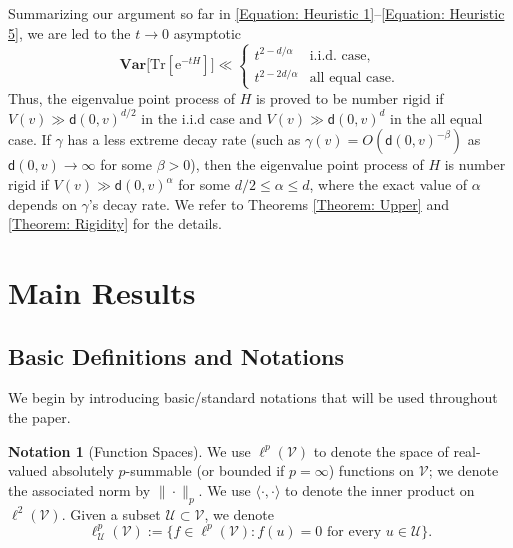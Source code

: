 \documentclass{amsart}
\numberwithin{equation}{section}
\theoremstyle{definition}
\newtheorem{notation}[theorem]{Notation}
\newcommand\al{\alpha}
\newcommand\be{\beta}
\newcommand\ga{\gamma}
\newcommand\mbf{\mathbf}
\newcommand\mr{\mathrm}
\newcommand\ms{\mathscr}
\newcommand\msf{\mathsf}
\begin{document}
%

Summarizing our argument so far in \eqref{Equation: Heuristic 1}--\eqref{Equation: Heuristic 5},
we are led to the $t\to0$ asymptotic
\[\mbf{Var}\big[\mr{Tr}[\mr e^{-t H}]\big]
\ll
\begin{cases}
t^{2-d/\al}&\text{i.i.d. case,}\\
t^{2-2d/\al}&\text{all equal case.}
\end{cases}\]
Thus, the eigenvalue point process of $H$ is proved to be number rigid if $V(v)\gg\msf d(0,v)^{d/2}$ in the i.i.d case
and $V(v)\gg\msf d(0,v)^d$ in the all equal case. If $\ga$ has a less extreme decay rate
(such as $\ga(v)=O(\msf d(0,v)^{-\be})$ as $\msf d(0,v)\to\infty$ for some $\be>0$), then the eigenvalue point process of $H$ is number rigid if $V(v)\gg\msf d(0,v)^\al$ for some $d/2\leq\al\leq d$, where the exact value
of $\al$ depends on $\ga$'s decay rate. We refer to Theorems \ref{Theorem: Upper} and \ref{Theorem: Rigidity}
for the details.

%

\section{Main Results}\label{sec:Main Result}

%

\subsection{Basic Definitions and Notations}

%

We begin by introducing basic/standard notations
that will be used throughout the paper.

%

\begin{notation}[Function Spaces]
We use $\ell^p(\ms V)$ to denote the space of real-valued
absolutely $p$-summable (or bounded if $p=\infty$) functions on $\ms V$; we
denote the associated norm by $\|\cdot\|_{p}$.
We use $\langle\cdot,\cdot\rangle$ to denote the inner
product on $\ell^2(\ms V)$.
Given a subset $\ms U\subset\ms V$, we denote
\[\ell^p_\ms U(\ms V):=\{f\in\ell^p(\ms V):f(u)=0\text{ for every }u\in\ms U\}.\]
\end{notation}

%
\end{document}

